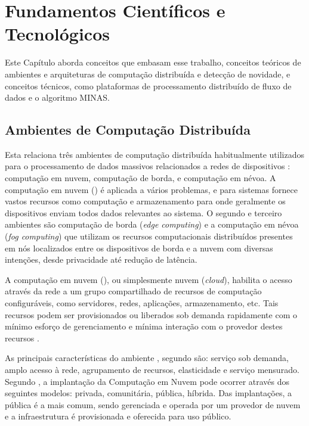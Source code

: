 
\chapter{Fundamentos Científicos e Tecnológicos}\label{cha:fundamentos}

Este Capítulo aborda conceitos que embasam esse trabalho,
conceitos teóricos de
ambientes e arquiteturas de computação distribuída e detecção de novidade,
e conceitos técnicos, como plataformas de processamento distribuído de fluxo
de dados e o algoritmo MINAS.

\section{Ambientes de Computação Distribuída}

Esta \Section relaciona três ambientes de computação distribuída habitualmente
utilizados para o processamento de dados massivos relacionados a redes de
dispositivos \iot: computação em nuvem, computação de borda, e computação em névoa.
A computação em nuvem (\cloud) é
aplicada a vários problemas, e para sistemas \iot 
fornece vastos recursos como computação e armazenamento para onde geralmente os dispositivos
enviam todos dados relevantes ao sistema.
O segundo e terceiro ambientes são computação de borda (\emph{edge computing})
e a computação em névoa (\emph{fog computing}) que utilizam os recursos
computacionais distribuídos presentes em nós localizados entre os dispositivos
de borda e a nuvem com diversas 
intenções, desde privacidade até redução de latência.


A computação em nuvem (\cloud), ou simplesmente nuvem
(\emph{cloud}), habilita o acesso através da rede a um grupo compartilhado de
recursos de computação configuráveis, como servidores, redes, aplicações,
armazenamento, etc.
Tais recursos podem ser provisionados ou liberados sob
demanda rapidamente com o mínimo esforço de gerenciamento
e mínima interação com o provedor destes recursos \cite{NIST2011}.

As principais características do ambiente \cloud, segundo 
são: serviço sob demanda, amplo acesso à rede, agrupamento de recursos,
elasticidade e serviço mensurado.
Segundo , a implantação da Computação em Nuvem pode
ocorrer através dos seguintes modelos: privada, comunitária, pública, híbrida.
Das implantações, a pública é a mais comum, sendo gerenciada e operada por um
provedor de nuvem e a infraestrutura é provisionada e oferecida para uso
público.

